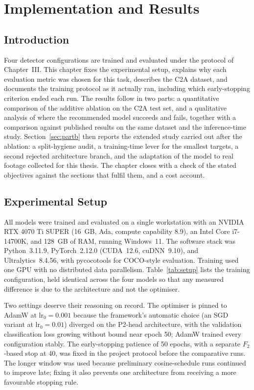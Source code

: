 \chapter{Implementation and Results}

\section{Introduction}
Four detector configurations are trained and evaluated under the protocol of
Chapter~III. This chapter fixes the experimental
setup, explains why each evaluation metric was chosen for this task, describes
the C2A dataset, and documents the training protocol as it actually ran,
including which early-stopping criterion ended each run. The results follow in
two parts: a quantitative comparison of the additive ablation on the C2A test
set, and a qualitative analysis of where the recommended model succeeds and
fails, together with a comparison against published results on the same
dataset and the inference-time study. Section~\ref{sec:partb} then reports the
extended study carried out after the ablation: a split-hygiene audit, a
training-time lever for the smallest targets, a second rejected architecture
branch, and the adaptation of the model to real footage collected for this
thesis. The chapter closes with a check of the stated objectives against the
sections that fulfil them, and a cost account.

\section{Experimental Setup}
\label{sec:setup}
All models were trained and evaluated on a single workstation with an NVIDIA
RTX 4070 Ti SUPER (16~GB, Ada, compute capability 8.9), an Intel Core
i7-14700K, and 128~GB of RAM, running Windows~11. The software stack was
Python~3.11.9, PyTorch~2.12.0 (CUDA~12.6, cuDNN~9.10), and Ultralytics~8.4.56,
with pycocotools for COCO-style evaluation. Training used one GPU with no
distributed data parallelism. Table~\ref{tab:setup} lists the training
configuration, held identical across the four models so that any measured
difference is due to the architecture and not the optimiser.

Two settings deserve their reasoning on record. The optimiser is pinned to
AdamW at $\text{lr}_0 = 0.001$ because the framework's automatic choice
(an SGD variant at $\text{lr}_0 = 0.01$) diverged on the P2-head
architecture, with the validation classification loss growing without bound
near epoch 50; AdamW trained every configuration stably. The early-stopping
patience of 50 epochs, with a separate $F_2$-based stop at 40, was fixed in
the project protocol before the comparative runs. The longer window was used
because preliminary cosine-schedule runs continued to improve late; fixing it
also prevents one architecture from receiving a more favourable stopping rule.


